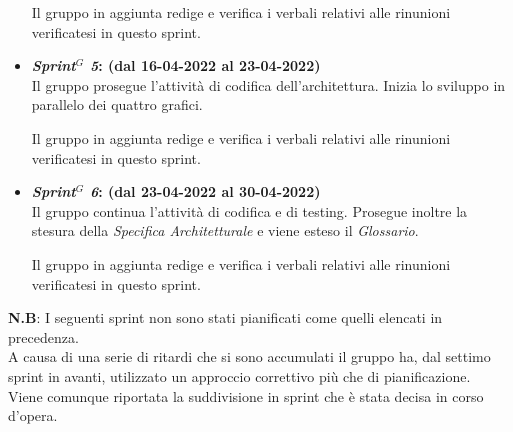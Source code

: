 \begin{itemize}
    Il gruppo in aggiunta redige e verifica i verbali relativi alle rinunioni verificatesi in questo sprint.

    \item \textbf{\textit{Sprint$^G$  5}: (dal 16-04-2022 al 23-04-2022)}\\
    Il gruppo prosegue l'attività di codifica dell'architettura. Inizia lo sviluppo in parallelo dei quattro grafici. 

    Il gruppo in aggiunta redige e verifica i verbali relativi alle rinunioni verificatesi in questo sprint.

    \item \textbf{\textit{Sprint$^G$  6}: (dal 23-04-2022 al 30-04-2022)}\\
    Il gruppo continua l'attività di codifica e di testing. Prosegue inoltre la stesura della \textit{Specifica Architetturale} e viene esteso il \textit{Glossario}.

    Il gruppo in aggiunta redige e verifica i verbali relativi alle rinunioni verificatesi in questo sprint.
\end{itemize}
\medskip
\textbf{N.B}: I seguenti sprint non sono stati pianificati come quelli elencati in precedenza.
\\ A causa di una serie di ritardi che si sono accumulati il gruppo 
ha, dal settimo sprint in avanti, utilizzato un approccio correttivo più che di pianificazione. \\ Viene comunque riportata la suddivisione in sprint che è stata 
decisa in corso d'opera.

